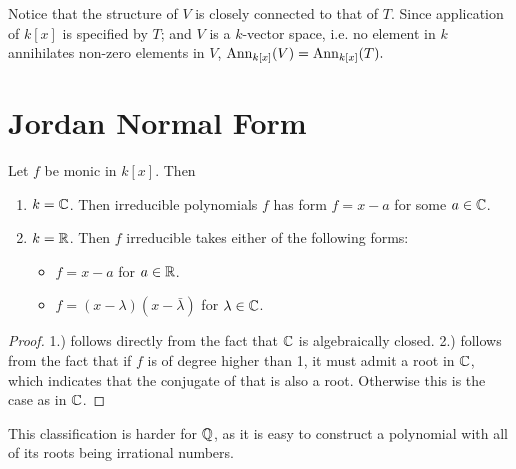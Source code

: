 \documentclass{article}
\begin{document}
\begin{remark}
    Notice that the structure of $V$ is closely connected to that of $T$. Since application of $k[x]$ is specified by $T$; and $V$ is a $k$-vector space, i.e. no element in $k$ annihilates non-zero elements in $V$, $\mathrm{Ann}_{k[x]}(V) = \mathrm{Ann}_{k[x]}(T).$
\end{remark}

\section{Jordan Normal Form}

\begin{parenthesis}
    Let $f$ be monic in $k[x]$. Then
    \begin{enumerate}
        \item $k = \mathbb{C}$. Then irreducible polynomials $f$ has form $f = x - a$ for some $a\in \mathbb{C}$. 
        \item $k = \mathbb{R}$. Then $f$ irreducible takes either of the following forms:
            \begin{itemize}
                \item $f = x - a$ for $a\in \mathbb{R}$.
                \item $f = (x - \lambda)(x - \bar{\lambda})$ for $\lambda \in \mathbb{C}$.
            \end{itemize}
    \end{enumerate}
\end{parenthesis}

\begin{proof}
    1.) follows directly from the fact that $\mathbb{C}$ is algebraically closed.  2.) follows from the fact that if $f$ is of degree higher than 1, it must admit a root in $\mathbb{C}$, which indicates that the conjugate of that is also a root. Otherwise this is the case as in $\mathbb{C}$.
\end{proof}

\begin{remark}
    This classification is harder for $\mathbb{Q}$, as it is easy to construct a polynomial with all of its roots being irrational numbers.
\end{remark}
\end{document}

